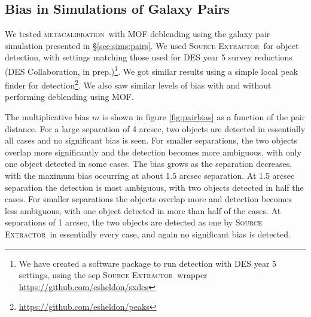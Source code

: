 \documentclass[fleqn,useAMS,usenatbib]{mnras}
\newcommand{\mcal}{\textsc{metacalibration}}
\newcommand{\sx}{\textsc{Source Extractor}}
\begin{document}
\subsection{Bias in Simulations of Galaxy Pairs}

We tested \mcal\ with MOF deblending using the galaxy pair simulation presented
in \S \ref{sec:sims:pairs}. We used \sx\ for object detection, with settings
matching those used for DES year 5 survey reductions (DES Collaboration, in
prep.)\footnote{We have created a software package to run detection with DES
year 5 settings, using the sep \sx\ wrapper
\url{https://github.com/esheldon/sxdes}}.  We got similar results using a
simple local peak finder for
detection\footnote{\url{https://github.com/esheldon/peaks}}.  We also saw
similar levels of bias with and without performing deblending using MOF.

The multiplicative bias $m$ is shown in figure \ref{fig:pairbias} as a function
of the pair distance. For a large separation of 4 arcsec, two objects are
detected in essentially all cases and no significant bias is seen.  For smaller
separations, the two objects overlap more significantly and the detection
becomes more ambiguous, with only one object detected in some cases.  The bias
grows as the separation decreases, with the maximum bias occurring at about 1.5
arcsec separation. At 1.5 arcsec separation the detection is most ambiguous,
with two objects detected in half the cases. For smaller separations the
objects overlap more and detection becomes less ambiguous, with one object
detected in more than half of the cases. At separations of 1 arcsec, the two
objects are detected as one by \sx\ in essentially every case, and again no
significant bias is detected.
\end{document}

